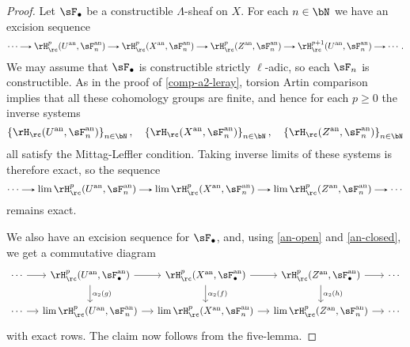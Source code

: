 \begin{nothing}
\begin{sublemma}
    \begin{proof}
      Let $\sF_\bullet$ be a constructible $\Lambda$-sheaf on $X$. For each $n \in \bN$ we have an excision sequence
      \[
        \cdots \to \rH_\rc^p(U^\an, \sF_n^\an) \to \rH_\rc^p(X^\an, \sF_n^\an) \to \rH_\rc^p(Z^\an, \sF_n^\an) \to \rH_\rc^{p+1}(U^\an, \sF_n^\an) \to \cdots.
      \]
      We may assume that $\sF_\bullet$ is constructible strictly $\ell$-adic, so each $\sF_n$ is constructible. As in the proof of \cref{comp-a2-leray}, torsion Artin comparison implies that all these cohomology groups are finite, and hence for each $p \ge 0$ the inverse systems
      \[
        \l\{\rH_\rc(U^\an, \sF_n^\an)\r\}_{n \in \bN}, \quad
        \l\{\rH_\rc(X^\an, \sF_n^\an)\r\}_{n \in \bN}, \quad
        \l\{\rH_\rc(Z^\an, \sF_n^\an)\r\}_{n \in \bN}
      \]
      all satisfy the Mittag-Leffler condition. Taking inverse limits of these systems is therefore exact, so the sequence
      \[
        \cdots \to \lim \rH_\rc^p(U^\an, \sF_n^\an) \to \lim \rH_\rc^p(X^\an, \sF_n^\an) \to \lim \rH_\rc^p(Z^\an, \sF_n^\an) \to \cdots
      \]
      remains exact.

      We also have an excision sequence for $\sF_\bullet$, and, using \cref{an-open} and \cref{an-closed}, we get a commutative diagram
      \[
        \begin{tikzcd}[column sep = small]
          \cdots \ar[r] &
          \rH_\rc^p(U^\an, \sF_\bullet^\an) \ar[r] \ar[d, "\alpha_2(g)"] &
          \rH_\rc^p(X^\an, \sF_\bullet^\an) \ar[r] \ar[d, "\alpha_2(f)"] &
          \rH_\rc^p(Z^\an, \sF_\bullet^\an) \ar[r] \ar[d, "\alpha_2(h)"] &
          \cdots \\
          \cdots \ar[r] &
          \lim\rH_\rc^p(U^\an, \sF_n^\an) \ar[r] &
          \lim\rH_\rc^p(X^\an, \sF_n^\an) \ar[r] &
          \lim\rH_\rc^p(Z^\an, \sF_n^\an) \ar[r] &
          \cdots
        \end{tikzcd}
      \]
      with exact rows. The claim now follows from the five-lemma.
    \end{proof}
  \end{sublemma}




\end{nothing}
